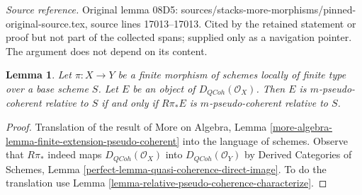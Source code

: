 \documentclass[10pt,a4paper]{amsart}
\theoremstyle{plain}
\newtheorem{lemma}[subsection]{Lemma}
\theoremstyle{definition}
\theoremstyle{remark}
\numberwithin{equation}{subsection}
\def\QCoh{\mathit{QCoh}}
\begin{document}
\noindent\textit{Source reference.} Original lemma 08D5: sources/stacks-more-morphisms/pinned-original-source.tex, source lines 17013--17013. Cited by the retained statement or proof but not part of the collected spans; supplied only as a navigation pointer. The argument does not depend on its content.\par\medskip
\begin{lemma}
\label{lemma-finite-morphism-relative-pseudo-coherence}
Let $\pi : X \to Y$ be a finite morphism of schemes locally of finite
type over a base scheme $S$. Let $E$ be an object of
$D_\QCoh(\mathcal{O}_X)$. Then $E$ is $m$-pseudo-coherent
relative to $S$ if and only if $R\pi_*E$ is $m$-pseudo-coherent
relative to $S$.
\end{lemma}

\begin{proof}
Translation of the result of
More on Algebra, Lemma
\ref{more-algebra-lemma-finite-extension-pseudo-coherent}
into the language of schemes. Observe that $R\pi_*$ indeed
maps $D_\QCoh(\mathcal{O}_X)$ into $D_\QCoh(\mathcal{O}_Y)$
by Derived Categories of Schemes, Lemma
\ref{perfect-lemma-quasi-coherence-direct-image}.
To do the translation use
Lemma \ref{lemma-relative-pseudo-coherence-characterize}.
\end{proof}
\end{document}
